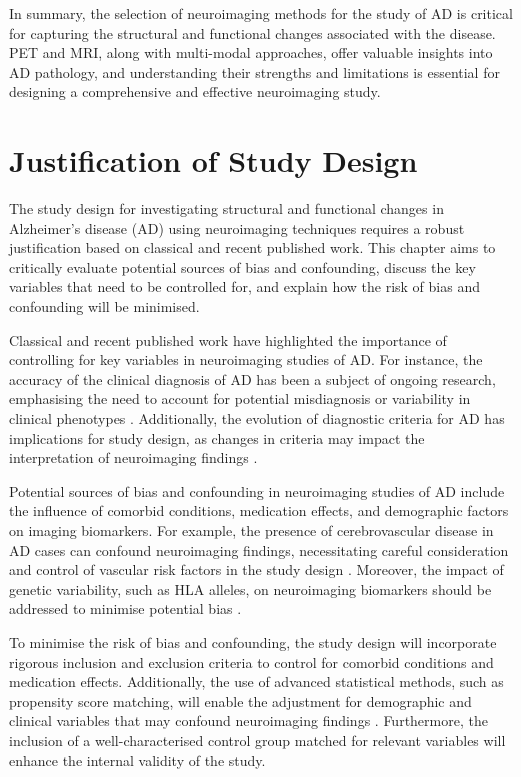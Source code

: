 \documentclass[10pt]{article}
\begin{document}
\begin{sloppypar}
  In summary, the selection of neuroimaging methods for the study of AD is critical for capturing the structural and functional changes associated with the disease. PET and MRI, along with multi-modal approaches, offer valuable insights into AD pathology, and understanding their strengths and limitations is essential for designing a comprehensive and effective neuroimaging study.

  \section{Justification of Study Design}
  \label{sec:justification-of-study-design}

  The study design for investigating structural and functional changes in Alzheimer's disease (AD) using neuroimaging techniques requires a robust justification based on classical and recent published work. This chapter aims to critically evaluate potential sources of bias and confounding, discuss the key variables that need to be controlled for, and explain how the risk of bias and confounding will be minimised.

  Classical and recent published work have highlighted the importance of controlling for key variables in neuroimaging studies of AD. For instance, the accuracy of the clinical diagnosis of AD has been a subject of ongoing research, emphasising the need to account for potential misdiagnosis or variability in clinical phenotypes . Additionally, the evolution of diagnostic criteria for AD has implications for study design, as changes in criteria may impact the interpretation of neuroimaging findings .

  Potential sources of bias and confounding in neuroimaging studies of AD include the influence of comorbid conditions, medication effects, and demographic factors on imaging biomarkers. For example, the presence of cerebrovascular disease in AD cases can confound neuroimaging findings, necessitating careful consideration and control of vascular risk factors in the study design . Moreover, the impact of genetic variability, such as HLA alleles, on neuroimaging biomarkers should be addressed to minimise potential bias .

  To minimise the risk of bias and confounding, the study design will incorporate rigorous inclusion and exclusion criteria to control for comorbid conditions and medication effects. Additionally, the use of advanced statistical methods, such as propensity score matching, will enable the adjustment for demographic and clinical variables that may confound neuroimaging findings . Furthermore, the inclusion of a well-characterised control group matched for relevant variables will enhance the internal validity of the study.


\end{sloppypar}
\end{document}
